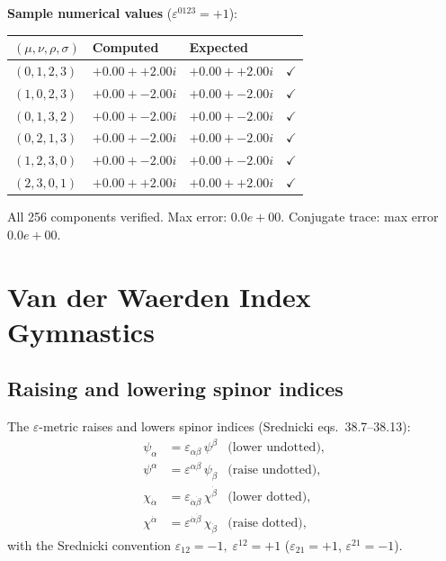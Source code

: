 \documentclass[12pt]{article}
\newcommand{\verified}[1]{\textcolor{verifygreen}{\checkmark\; #1}}
\begin{document}
\textbf{Sample numerical values} ($\varepsilon^{0123}=+1$):
\medskip
\begin{center}
\begin{tabular}{@{}llll@{}}
  \toprule
  $(\mu,\nu,\rho,\sigma)$ & Computed & Expected & \\
  \midrule
  $(0,1,2,3)$ & $+0.00++2.00i$ & $+0.00++2.00i$ & $\checkmark$ \\
  $(1,0,2,3)$ & $+0.00+-2.00i$ & $+0.00+-2.00i$ & $\checkmark$ \\
  $(0,1,3,2)$ & $+0.00+-2.00i$ & $+0.00+-2.00i$ & $\checkmark$ \\
  $(0,2,1,3)$ & $+0.00+-2.00i$ & $+0.00+-2.00i$ & $\checkmark$ \\
  $(1,2,3,0)$ & $+0.00+-2.00i$ & $+0.00+-2.00i$ & $\checkmark$ \\
  $(2,3,0,1)$ & $+0.00++2.00i$ & $+0.00++2.00i$ & $\checkmark$ \\
  \bottomrule
\end{tabular}
\end{center}
\verified{All 256 components verified. Max error: $0.0e+00$.}
\verified{Conjugate trace: max error $0.0e+00$.}

\section{Van der Waerden Index Gymnastics}

\subsection{Raising and lowering spinor indices}

The $\varepsilon$-metric raises and lowers spinor indices
(Srednicki eqs.~38.7--38.13):
\begin{align}
  \psi_\alpha &= \varepsilon_{\alpha\beta}\,\psi^\beta
  &\text{(lower undotted)},
  \tag{38.7}\\
  \psi^\alpha &= \varepsilon^{\alpha\beta}\,\psi_\beta
  &\text{(raise undotted)},
  \tag{38.8}\\
  \chi_{\dot\alpha} &= \varepsilon_{\dot\alpha\dot\beta}\,\chi^{\dot\beta}
  &\text{(lower dotted)},
  \tag{38.9}\\
  \chi^{\dot\alpha} &= \varepsilon^{\dot\alpha\dot\beta}\,\chi_{\dot\beta}
  &\text{(raise dotted)},
  \tag{38.10}
\end{align}
with the Srednicki convention
$\varepsilon_{12}=-1,\;\varepsilon^{12}=+1$
($\varepsilon_{21}=+1$, $\varepsilon^{21}=-1$).
\end{document}
